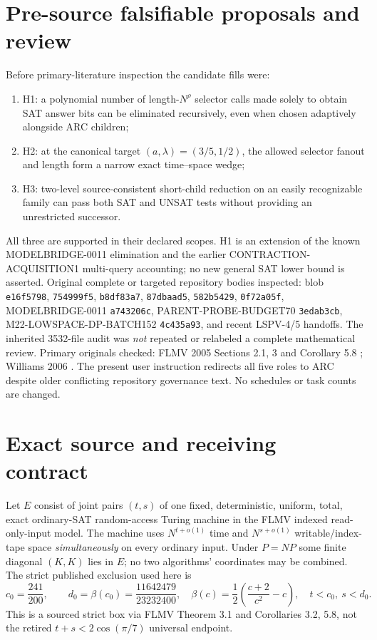\documentclass[11pt]{article}
\begin{document}
\section{Pre-source falsifiable proposals and review}
Before primary-literature inspection the candidate fills were:
\begin{enumerate}
\item[] H1: a polynomial number of length-$N^\rho$ selector calls made solely to obtain SAT answer bits can be eliminated recursively, even when chosen adaptively alongside ARC children;
\item[] H2: at the canonical target $(a,\lambda)=(3/5,1/2)$, the allowed selector fanout and length form a narrow exact time--space wedge;
\item[] H3: two-level source-consistent short-child reduction on an easily recognizable family can pass both SAT and UNSAT tests without providing an unrestricted successor.
\end{enumerate}
All three are supported in their declared scopes. H1 is an extension of the known MODELBRIDGE-0011 elimination and the earlier CONTRACTION-ACQUISITION1 multi-query accounting; no new general SAT lower bound is asserted.
Original complete or targeted repository bodies inspected:  blob \texttt{e16f5798},  \texttt{754999f5},  \texttt{b8df83a7},  \texttt{87dbaad5},  \texttt{582b5429},  \texttt{0f72a05f}, MODELBRIDGE-0011 \texttt{a743206c}, PARENT-PROBE-BUDGET70 \texttt{3edab3cb}, M22-LOWSPACE-DP-BATCH152 \texttt{4c435a93}, and recent LSPV-4/5 handoffs. The inherited 3532-file audit was \emph{not} repeated or relabeled a complete mathematical review. Primary originals checked: FLMV 2005 Sections 2.1, 3 and Corollary 5.8 \cite{flmv}; Williams 2006 \cite{williams}. The present user instruction redirects all five roles to ARC despite older conflicting repository governance text. No schedules or task counts are changed.
\section{Exact source and receiving contract}
Let $E$ consist of joint pairs $(t,s)$ of one fixed, deterministic, uniform, total, exact ordinary-SAT random-access Turing machine in the FLMV indexed read-only-input model. The machine uses $N^{t+o(1)}$ time and $N^{s+o(1)}$ writable/index-tape space \emph{simultaneously} on every ordinary input. Under $P=NP$ some finite diagonal $(K,K)$ lies in $E$; no two algorithms' coordinates may be combined. The strict published exclusion used here is
\[
c_0=\frac{241}{200},\qquad d_0=\beta(c_0)=\frac{11642479}{23232400},\quad
\beta(c)=\frac12\left(\frac{c+2}{c^2}-c\right),\quad
t<c_0,\ s<d_0.
\]
This is a sourced strict box via FLMV Theorem 3.1 and Corollaries 3.2, 5.8, not the retired $t+s<2\cos(\pi/7)$ universal endpoint.
\end{document}
